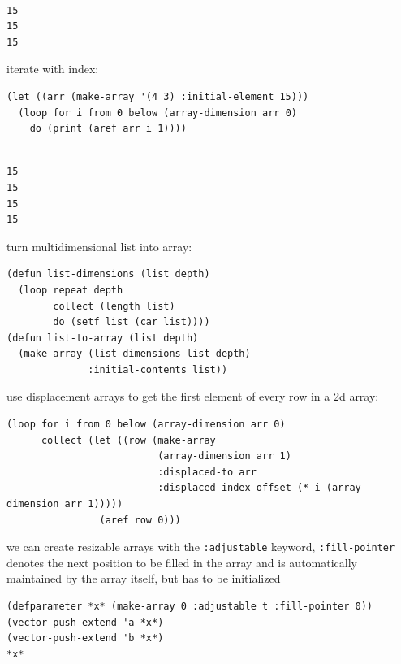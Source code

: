 \documentclass[a4paper,12pt]{article}
\begin{document}
\begin{verbatim}

15 
15 
15 
\end{verbatim}


iterate with index:\\
\lstset{language=Lisp,label= ,caption= ,captionpos=b,numbers=none}
\begin{lstlisting}
(let ((arr (make-array '(4 3) :initial-element 15)))
  (loop for i from 0 below (array-dimension arr 0)
    do (print (aref arr i 1))))
\end{lstlisting}

\begin{verbatim}

15 
15 
15 
15 
\end{verbatim}


turn multidimensional list into array:\\
\lstset{language=Lisp,label= ,caption= ,captionpos=b,numbers=none}
\begin{lstlisting}
(defun list-dimensions (list depth)
  (loop repeat depth
        collect (length list)
        do (setf list (car list))))
(defun list-to-array (list depth)
  (make-array (list-dimensions list depth)
              :initial-contents list))
\end{lstlisting}

use displacement arrays to get the first element of every row in a 2d array:\\
\lstset{language=Lisp,label= ,caption= ,captionpos=b,numbers=none}
\begin{lstlisting}
(loop for i from 0 below (array-dimension arr 0)
      collect (let ((row (make-array
                          (array-dimension arr 1)
                          :displaced-to arr
                          :displaced-index-offset (* i (array-dimension arr 1)))))
                (aref row 0)))
\end{lstlisting}

we can create resizable arrays with the \texttt{:adjustable} keyword, \texttt{:fill-pointer} denotes the next position to be filled in the array and is automatically maintained by the array itself, but has to be initialized\\
\lstset{language=Lisp,label= ,caption= ,captionpos=b,numbers=none}
\begin{lstlisting}
(defparameter *x* (make-array 0 :adjustable t :fill-pointer 0))
(vector-push-extend 'a *x*)
(vector-push-extend 'b *x*)
*x*
\end{lstlisting}
\end{document}
